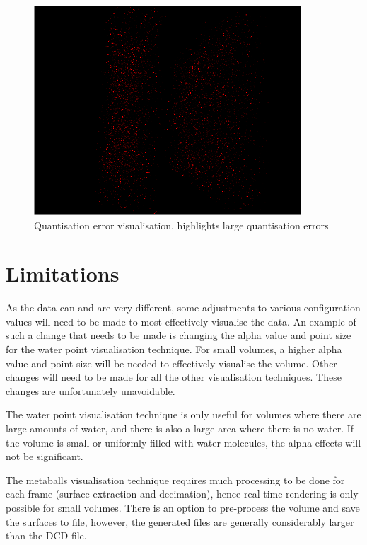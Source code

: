 \begin{figure}[h!]
  \begin{center}
    \includegraphics[width=100mm]{quanterror}
  \end{center}
  \caption{Quantisation error visualisation, highlights large quantisation
  errors}
  \label{fig:implementation_quanterror}
\end{figure}



\section{Limitations}
\label{sec:implementation_limitations}

As the data can and are very different, some adjustments to various
configuration values will need to be made to most effectively visualise the
data. An example of such a change that needs to be made is changing the alpha
value and point size for the water point visualisation technique. For small
volumes, a higher alpha value and point size will be needed to effectively
visualise the volume. Other changes will need to be made for all the other
visualisation techniques. These changes are unfortunately unavoidable.

The water point visualisation technique is only useful for volumes where there
are large amounts of water, and there is also a large area where there is no
water. If the volume is small or uniformly filled with water molecules, the
alpha effects will not be significant.

The metaballs visualisation technique requires much processing to be done for
each frame (surface extraction and decimation), hence real time rendering is
only possible for small volumes. There is an option to pre-process the volume
and save the surfaces to file, however, the generated files are generally
considerably larger than the DCD file.



